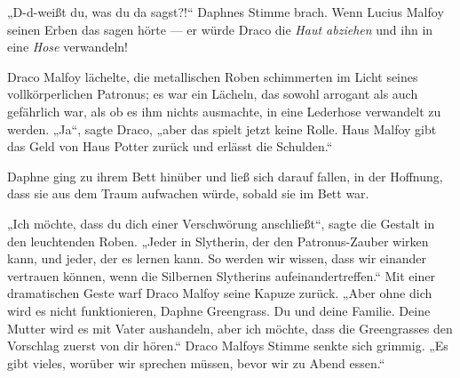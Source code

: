 „D-d-weißt du, was du da sagst?!“ Daphnes Stimme brach. Wenn Lucius Malfoy seinen Erben das sagen hörte — er würde Draco die \emph{Haut abziehen} und ihn in eine \emph{Hose} verwandeln!

Draco Malfoy lächelte, die metallischen Roben schimmerten im Licht seines vollkörperlichen Patronus; es war ein Lächeln, das sowohl arrogant als auch gefährlich war, als ob es ihm nichts ausmachte, in eine Lederhose verwandelt zu werden.
„Ja“, sagte Draco, „aber das spielt jetzt keine Rolle. Haus Malfoy gibt das Geld von Haus Potter zurück und erlässt die Schulden.“

Daphne ging zu ihrem Bett hinüber und ließ sich darauf fallen, in der Hoffnung, dass sie aus dem Traum aufwachen würde, sobald sie im Bett war.

„Ich möchte, dass du dich einer Verschwörung anschließt“, sagte die Gestalt in den leuchtenden Roben.
„Jeder in Slytherin, der den Patronus-Zauber wirken kann, und jeder, der es lernen kann. So werden wir wissen, dass wir einander vertrauen können, wenn die Silbernen Slytherins aufeinandertreffen.“
Mit einer dramatischen Geste warf Draco Malfoy seine Kapuze zurück.
„Aber ohne dich wird es nicht funktionieren, Daphne Greengrass. Du und deine Familie. Deine Mutter wird es mit Vater aushandeln, aber ich möchte, dass die Greengrasses den Vorschlag zuerst von dir hören.“
Draco Malfoys Stimme senkte sich grimmig.
„Es gibt vieles, worüber wir sprechen müssen, bevor wir zu Abend essen.“

